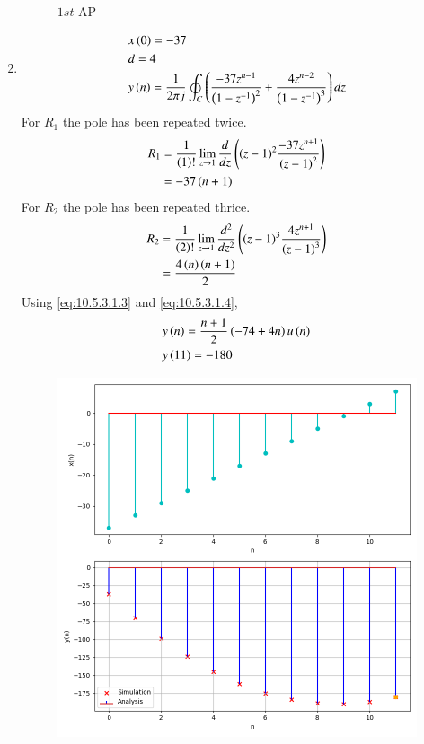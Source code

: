 \documentclass[journal,12pt,twocolumn]{IEEEtran}
\theoremstyle{remark}
\begin{document}
\begin{enumerate}[label=(\alph*)]
\begin{figure}[h!]
        \caption{$1st$ AP}
    \end{figure}
    \item \begin{align}
        &x\left(0\right)=-37 \\
        &d=4 \\
        &y\left(n\right)=\frac{1}{2\pi j}\oint_{C}\left(\dfrac{-37z^{n-1}}{\left(1-z^{-1}\right)^2} + \dfrac{4z^{n-2}}{\left(1-z^{-1}\right)^{3}}\right)dz
    \end{align}
    For $R_1$ the pole has been repeated twice.
\begin{align}
    R_1&=\frac{1}{\left(1\right)!}\lim\limits_{z\to 1}\frac{d}{dz}\left({\left(z-1\right)}^{2}\frac{-37z^{n+1}}{{\left(z-1\right)}^2}\right)\\
    &=-37\left(n+1\right)\label{eq:10.5.3.1.3}
\end{align}
    For $R_2$ the pole has been repeated thrice.
\begin{align}
    R_2&=\frac{1}{\left(2\right)!}\lim\limits_{z\to 1}\frac{d^{2}}{dz^{2}}\left({\left(z-1\right)}^{3}\frac{4z^{n+1}}{{\left(z-1\right)}^3}\right)\\
    &=\frac{4\left(n\right)\left(n+1\right)}{2}\label{eq:10.5.3.1.4}
\end{align}
Using \eqref{eq:10.5.3.1.3} and \eqref{eq:10.5.3.1.4},
\begin{align}
    &y\left(n\right)=\dfrac{n+1}{2}\left(-74+4n\right)u\left(n\right)\\
    &y\left(11\right)=-180
\end{align}
    \begin{figure}[h!]
        \centering
        \includegraphics[width=\columnwidth]{figs/plt2.png}

\end{figure}
\end{enumerate}
\end{document}
